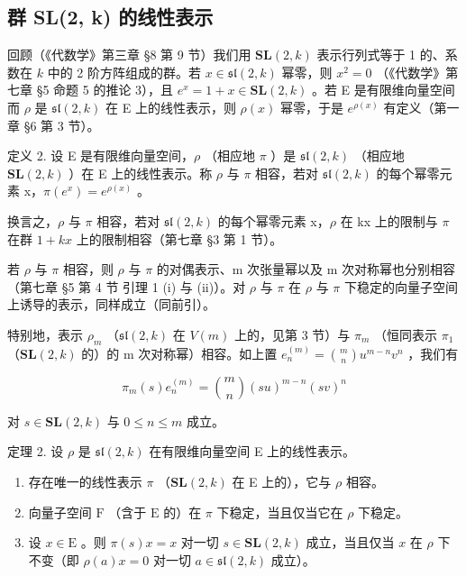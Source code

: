 \subsection{群 SL(2, k) 的线性表示}

回顾（《代数学》第三章 §8 第 9 节）我们用 \(\mathbf{SL}(2,k)\) 表示行列式等于 1 的、系数在 \(k\) 中的 2 阶方阵组成的群。若 \(x\in \mathfrak{sl}(2,k)\) 幂零，则 \(x^{2} = 0\) （《代数学》第七章 §5 命题 5 的推论 3），且 \(e^x = 1 + x\in \mathbf{SL}(2,k)\) 。若 E 是有限维向量空间而 \(\rho\) 是 \(\mathfrak{sl}(2,k)\) 在 E 上的线性表示，则 \(\rho (x)\) 幂零，于是 \(e^{\rho (x)}\) 有定义（第一章 §6 第 3 节）。

定义 2. 设 E 是有限维向量空间，\(\rho\) （相应地 \(\pi\) ）是 \(\mathfrak{sl}(2,k)\) （相应地 \(\mathbf{SL}(2,k)\) ）在 E 上的线性表示。称 \(\rho\) 与 \(\pi\) 相容，若对 \(\mathfrak{sl}(2,k)\) 的每个幂零元素 x，\(\pi(e^{x}) = e^{\rho(x)}\) 。

换言之，\(\rho\) 与 \(\pi\) 相容，若对 \(\mathfrak{sl}(2,k)\) 的每个幂零元素 x，\(\rho\) 在 kx 上的限制与 \(\pi\) 在群 \(1 + kx\) 上的限制相容（第七章 §3 第 1 节）。

若 \(\rho\) 与 \(\pi\) 相容，则 \(\rho\) 与 \(\pi\) 的对偶表示、m 次张量幂以及 m 次对称幂也分别相容（第七章 §5 第 4 节 引理 1 (i) 与 (ii)）。对 \(\rho\) 与 \(\pi\) 在 \(\rho\) 与 \(\pi\) 下稳定的向量子空间上诱导的表示，同样成立（同前引）。

特别地，表示 \(\rho_{m}\) （\(\mathfrak{sl}(2,k)\) 在 \(V(m)\) 上的，见第 3 节）与 \(\pi_{m}\) （恒同表示 \(\pi_{1}\) （\(\mathbf{SL}(2,k)\) 的）的 m 次对称幂）相容。如上置 \(e_{n}^{(m)} = \binom{m}{n} u^{m-n} v^{n}\) ，我们有

\[
\pi_ {m} (s) e _ {n} ^ {(m)} = \binom {m} {n} (s u) ^ {m - n} (s v) ^ {n}\tag{3}
\]

对 \(s \in \mathbf{SL}(2, k)\) 与 \(0 \leq n \leq m\) 成立。

定理 2. 设 \(\rho\) 是 \(\mathfrak{sl}(2,k)\) 在有限维向量空间 E 上的线性表示。

\begin{enumerate}
\def\labelenumi{(\roman{enumi})}
\item
  存在唯一的线性表示 \(\pi\) （\(\mathbf{SL}(2,k)\) 在 E 上的），它与 \(\rho\) 相容。
\item
  向量子空间 \(\mathrm{F}\) （含于 \(\mathrm{E}\) 的）在 \(\pi\) 下稳定，当且仅当它在 \(\rho\) 下稳定。
\item
  设 \(x \in \mathrm{E}\) 。则 \(\pi(s)x = x\) 对一切 \(s \in \mathbf{SL}(2,k)\) 成立，当且仅当 \(x\) 在 \(\rho\) 下不变（即 \(\rho(a)x = 0\) 对一切 \(a \in \mathfrak{sl}(2,k)\) 成立）。
\end{enumerate}


